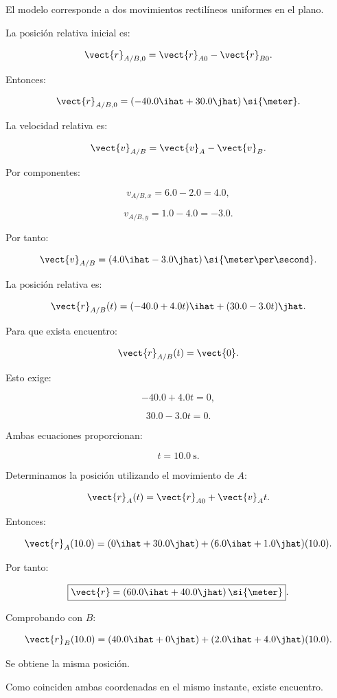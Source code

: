 \begin{explicacion}
El modelo corresponde a dos movimientos
rectilíneos uniformes en el plano.

La posición relativa inicial es:

\[
\vect{r}_{A/B,0}
=
\vect{r}_{A0}-\vect{r}_{B0}.
\]

Entonces:

\[
\vect{r}_{A/B,0}
=
(-40.0\ihat+30.0\jhat)\,\si{\meter}.
\]

La velocidad relativa es:

\[
\vect{v}_{A/B}
=
\vect{v}_A-\vect{v}_B.
\]

Por componentes:

\[
v_{A/B,x}=6.0-2.0=4.0,
\]

\[
v_{A/B,y}=1.0-4.0=-3.0.
\]

Por tanto:

\[
\vect{v}_{A/B}
=
(4.0\ihat-3.0\jhat)\,
\si{\meter\per\second}.
\]

La posición relativa es:

\[
\vect{r}_{A/B}(t)
=
(-40.0+4.0t)\ihat
+
(30.0-3.0t)\jhat.
\]

Para que exista encuentro:

\[
\vect{r}_{A/B}(t)=\vect{0}.
\]

Esto exige:

\[
-40.0+4.0t=0,
\]

\[
30.0-3.0t=0.
\]

Ambas ecuaciones proporcionan:

\[
\boxed{
t=\SI{10.0}{\second}
}.
\]

Determinamos la posición utilizando
el movimiento de \(A\):

\[
\vect{r}_A(t)
=
\vect{r}_{A0}+\vect{v}_At.
\]

Entonces:

\[
\vect{r}_A(10.0)
=
(0\ihat+30.0\jhat)
+
(6.0\ihat+1.0\jhat)(10.0).
\]

Por tanto:

\[
\boxed{
\vect{r}
=
(60.0\ihat+40.0\jhat)\,\si{\meter}
}.
\]

Comprobando con \(B\):

\[
\vect{r}_B(10.0)
=
(40.0\ihat+0\jhat)
+
(2.0\ihat+4.0\jhat)(10.0).
\]

Se obtiene la misma posición.

Como coinciden ambas coordenadas
en el mismo instante, existe encuentro.
\end{explicacion}


\nivelavanzado

